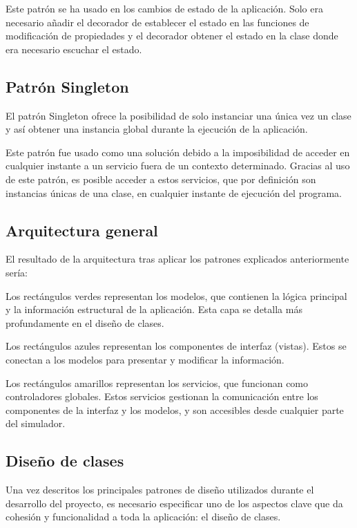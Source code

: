 Este patrón se ha usado en los cambios de estado de la aplicación. Solo era necesario añadir el decorador de establecer el estado en las funciones de modificación de propiedades y el decorador obtener el estado en la clase donde era necesario escuchar el estado.

\subsection{Patrón Singleton}
\label{subsec:PatronSingleton}
El patrón Singleton ofrece la posibilidad de solo instanciar una única vez un clase y así obtener una instancia global durante la ejecución de la aplicación.

Este patrón fue usado como una solución debido a la imposibilidad de acceder en cualquier instante a un servicio fuera de un contexto determinado. Gracias al uso de este patrón, es posible acceder a estos servicios, que por definición son instancias únicas de una clase, en cualquier instante de ejecución del programa.

\subsection{Arquitectura general}
\label{subsec:ArquitecturaGeneral}
El resultado de la arquitectura tras aplicar los patrones explicados anteriormente sería:


Los rectángulos verdes representan los modelos, que contienen la lógica principal y la información estructural de la aplicación. Esta capa se detalla más profundamente en el diseño de clases.

Los rectángulos azules representan los componentes de interfaz (vistas). Estos se conectan a los modelos para presentar y modificar la información.

Los rectángulos amarillos representan los servicios, que funcionan como controladores globales. Estos servicios gestionan la comunicación entre los componentes de la interfaz y los modelos, y son accesibles desde cualquier parte del simulador.

\subsection{Diseño de clases}
\label{subsec:DisenoClases}
Una vez descritos los principales patrones de diseño utilizados durante el desarrollo del proyecto, es necesario especificar uno de los aspectos clave que da cohesión y funcionalidad a toda la aplicación: el diseño de clases.

